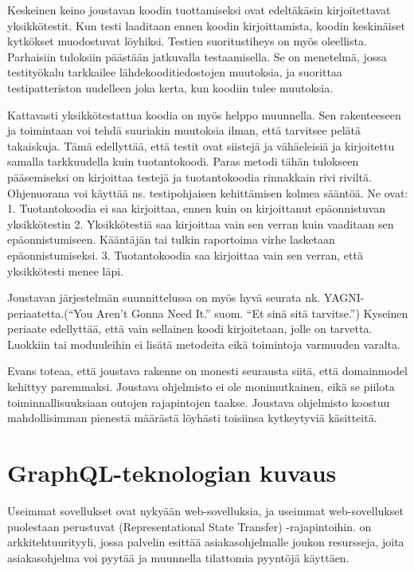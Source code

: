 Keskeinen keino joustavan koodin tuottamiseksi ovat edeltäkäsin
kirjoitettavat yksikkötestit. Kun testi laaditaan ennen koodin
kirjoittamista, koodin keskinäiset kytkökset muodostuvat löyhiksi.
Testien suoritustiheys on myös oleellista. Parhaisiin tuloksiin päästään
jatkuvalla testaamisella. Se on menetelmä, jossa testityökalu tarkkailee
lähdekooditiedostojen muutoksia, ja suorittaa testipatteriston uudelleen
joka kerta, kun koodiin tulee muutoksia. \cite[luku 6.]{beck2004extreme}

Kattavasti yksikkötestattua koodia on myös helppo muunnella. Sen
rakenteeseen ja toimintaan voi tehdä suuriakin muutoksia ilman, että
tarvitsee pelätä takaiskuja. Tämä edellyttää, että testit ovat siistejä
ja vähäeleisiä ja kirjoitettu samalla tarkkuudella kuin tuotantokoodi.
Paras metodi tähän tulokseen pääsemiseksi on kirjoittaa testejä ja
tuotantokoodia rinnakkain rivi riviltä. Ohjenuorana voi käyttää ns.
testipohjaisen kehittämisen kolmea sääntöä. Ne ovat: 1. Tuotantokoodia
ei saa kirjoittaa, ennen kuin on kirjoittanut epäonnistuvan
yksikkötestin 2. Yksikkötestiä saa kirjoittaa vain sen verran kuin
vaaditaan sen epäonnistumiseen. Kääntäjän tai tulkin raportoima virhe
lasketaan epäonnistumiseksi. 3. Tuotantokoodia saa kirjoittaa vain sen
verran, että yksikkötesti menee läpi. \cite[luku 9.]{martin2008clean}

Joustavan järjestelmän suunnittelussa on myös hyvä seurata nk.
YAGNI-periaatetta.(``You Aren't Gonna Need It.'' suom. ``Et sinä sitä
tarvitse.'') Kyseinen periaate edellyttää, että vain sellainen koodi
kirjoitetaan, jolle on tarvetta. Luokkiin tai moduuleihin ei lisätä
metodeita eikä toimintoja varmuuden varalta. \citep{jeffries1998}

Evans toteaa, että joustava rakenne on monesti seurausta siitä, että
\gls{domainmodel} kehittyy paremmaksi. Joustava ohjelmisto ei ole
monimutkainen, eikä se piilota toiminnallisuuksiaan outojen rajapintojen
taakse. Joustava ohjelmisto koostuu mahdollisimman pienestä määrästä
löyhästi toisiinsa kytkeytyviä käsitteitä. \citep[luku 10.]{evans:ddd}

\hypertarget{graphql-teknologian-kuvaus}{%
\section{GraphQL-teknologian kuvaus}\label{graphql-teknologian-kuvaus}}

Useimmat sovellukset ovat nykyään web-sovelluksia, ja useimmat
web-sovellukset puolestaan perustuvat 
(Representational State Transfer) -rajapintoihin.  on
arkkitehtuurityyli, jossa palvelin esittää asiakasohjelmalle joukon
resursseja, joita asiakasohjelma voi pyytää ja muunnella tilattomia
pyyntöjä käyttäen. \citep{fielding2000architectural}

